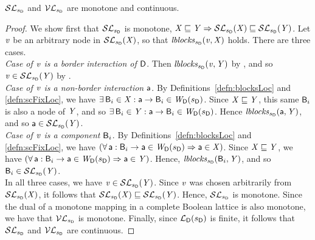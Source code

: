 \begin{proposition} \label{prop:monotoneLoc}
$\lSFsymb_{\sD}$ and $\lVFsymb_{\sD}$ are monotone and continuous.
\end{proposition}
%
\begin{proof}
We show first that $\lSFsymb_{\sD}$ is monotone, \ie $\XS \subg \YS \imp \lSFs{\sD}{\XS} \subg \lSFs{\sD}{\YS}$.
Let $\ndv$ be an arbitrary node in $\lSFs{\sD}{\XS}$, so that $\lblocks{\sD}{\ndv}{\XS}$ holds. There are three cases.\\

\emph{Case of $\ndv$ is a border interaction of $\DS$}. Then $\lblocks{\sD}{\ndv}{\YS}$ by , and so $\ndv \in  \lSFs{\sD}{\YS}$ by
.\\

\emph{Case of $\ndv$ is a non-border interaction $\act$}. By Definitions~\ref{defn:blocksLoc} and \ref{defn:scFixLoc}, we have
$\ex \B_i \in \XS  : \act \ar \B_i \in \lwfg{B}{\sD}{\DS}$.
Since $\XS \subg \YS$, this same $\B_i$ is also a node of $\YS$, and so  $\ex \B_i \in \YS  : \act \ar \B_i \in \lwfg{B}{\sD}{\DS}$. 
Hence  $\lblocks{\sD}{\act}{\YS}$, and so $\act \in \lSFs{\sD}{\YS}$. \\

\emph{Case of $\ndv$ is a component $\B_i$}. By Definitions~\ref{defn:blocksLoc} and \ref{defn:scFixLoc}, we have
$(\fa \act : \B_i \ar \act \in \lwfg{\B}{\sD}{\DS} \imp \act \in \XS)$.
Since $\XS \subg \YS$, we have  $(\fa \act : \B_i \ar \act \in \lwfg{B}{\sD}{\DS} \imp \act \in \YS)$. 
Hence, $\lblocks{\sD}{\B_i}{\YS}$, and so $\B_i \in \lSFs{\sD}{\YS}$. \\

In all three cases, we have $\ndv \in \lSFs{\sD}{\YS}$. Since $\ndv$ was chosen arbitrarily from $\lSFs{\sD}{\XS} $, it follows that
 $\lSFs{\sD}{\XS} \subg \lSFs{\sD}{\YS}$. Hence, $\lSFsymb_{\sD}$ is monotone.
%
Since the dual of a monotone mapping in a complete Boolean lattice is also monotone, we have that $\lVFsymb_{\sD}$ is monotone.
%
Finally, since $\llat{\B}{\sD}{\DS}$ is finite, it follows that $\lSFsymb_{\sD}$ and $\lVFsymb_{\sD}$ are continuous.
\end{proof}





